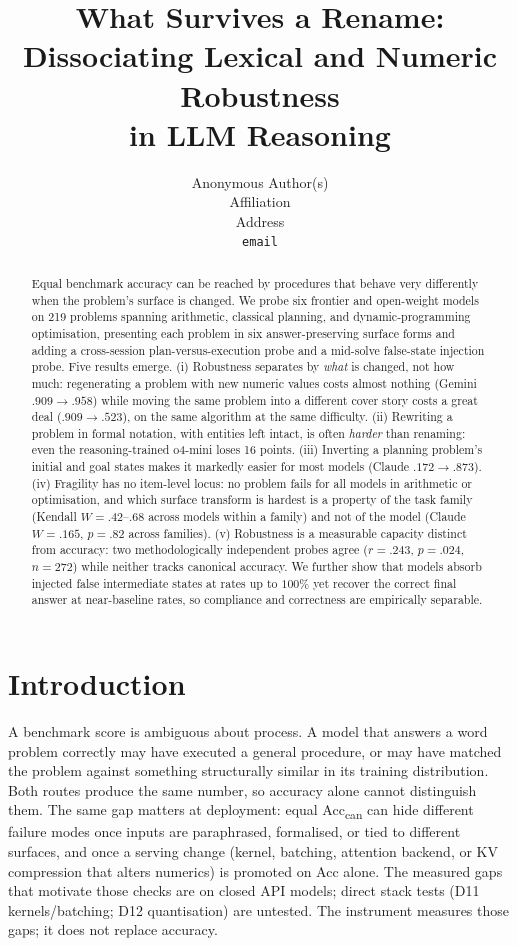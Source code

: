 \documentclass{article}
\title{What Survives a Rename:\\Dissociating Lexical and Numeric Robustness\\in LLM Reasoning}
\author{Anonymous Author(s)\\Affiliation\\Address\\\texttt{email}}
\begin{document}
\maketitle

\begin{abstract}
Equal benchmark accuracy can be reached by procedures that behave very differently
when the problem's surface is changed. We probe six frontier and open-weight models
on 219 problems spanning arithmetic, classical planning, and dynamic-programming
optimisation, presenting each problem in six answer-preserving surface forms and
adding a cross-session plan-versus-execution probe and a mid-solve false-state
injection probe. Five results emerge. (i) Robustness separates by \emph{what} is
changed, not how much: regenerating a problem with new numeric values costs almost
nothing (Gemini $.909 \rightarrow .958$) while moving the same problem into a different cover story costs a great
deal ($.909 \rightarrow .523$), on the same algorithm at the same difficulty.
(ii) Rewriting a problem in formal notation, with entities left intact, is often
\emph{harder} than renaming: even the reasoning-trained o4-mini loses 16 points.
(iii) Inverting a planning problem's initial and goal states makes it markedly
easier for most models (Claude $.172 \rightarrow .873$). (iv) Fragility has no
item-level locus: no problem fails for all models in arithmetic or optimisation,
and which surface transform is hardest is a property of the task family
(Kendall $W = .42$--$.68$ across models within a family) and not of the model
(Claude $W = .165$, $p = .82$ across families). (v) Robustness is a measurable
capacity distinct from accuracy: two methodologically independent probes agree
($r = .243$, $p = .024$, $n = 272$) while neither tracks canonical accuracy.
We further show that models absorb injected false intermediate states at rates up
to $100\%$ yet recover the correct final answer at near-baseline rates, so
compliance and correctness are empirically separable.
\end{abstract}

\section{Introduction}

A benchmark score is ambiguous about process. A model that answers a word problem
correctly may have executed a general procedure, or may have matched the problem
against something structurally similar in its training distribution. Both routes
produce the same number, so accuracy alone cannot distinguish them.
The same gap matters at deployment: equal Acc\textsubscript{can} can hide different
failure modes once inputs are paraphrased, formalised, or tied to different
surfaces, and once a serving change (kernel, batching, attention backend, or
KV compression that alters numerics) is promoted on Acc alone. The measured gaps
that motivate those checks are on closed API models; direct stack tests (D11
kernels/batching; D12 quantisation) are untested. The instrument measures those
gaps; it does not replace accuracy.
\end{document}
